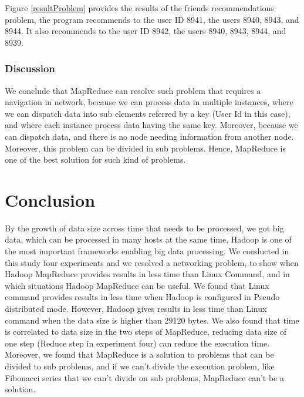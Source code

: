 \documentclass[10pt, conference]{IEEEtran}
\begin{document}
Figure \ref{resultProblem} provides the results of the friends recommendations problem, the program recommends to the user ID 8941, the users 8940, 8943, and 8944. It also recommends to the user ID 8942, the users 8940, 8943, 8944, and 8939.


\subsubsection{Discussion}
We conclude that MapReduce can resolve such problem that requires a navigation in network, because we can process data in multiple instances, where we can dispatch data into sub elements referred by a key (User Id in this case), and where each instance process data having the same key. Moreover, because we can dispatch data, and there is no node needing information from another node. Moreover, this problem can be divided in sub problems. Hence, MapReduce is one of the best solution for such kind of problems. 



\section{Conclusion}
\label{sec:conclusion}

By the growth of data size across time that needs to be processed, we got big data, which can be processed in many hosts at the same time, Hadoop is one of the most important frameworks enabling big data processing. We conducted in this study four experiments and we resolved a networking problem, to show when Hadoop MapReduce provides results in less time than Linux Command, and in which situations Hadoop MapReduce can be useful. We found that Linux command provides results in less time when Hadoop is configured in Pseudo distributed mode. However, Hadoop gives results in less time than Linux command when the data size is higher than 29120 bytes. We also found that time is correlated to data size in the two steps of MapReduce, reducing data size of one step (Reduce step in experiment four) can reduce the execution time. Moreover, we found that MapReduce is a solution to problems that can be divided to sub problems, and if we can't divide the execution problem, like Fibonacci series that we can't divide on sub problems, MapReduce can't be a solution.

\balance


\end{document}
